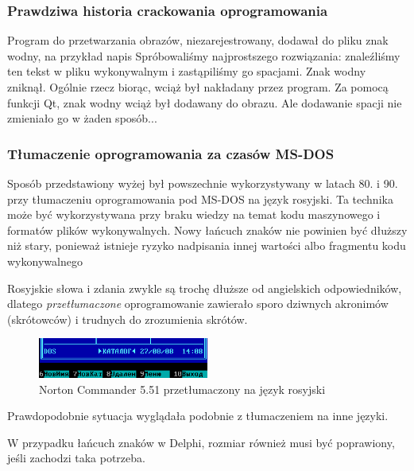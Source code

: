 \subsubsection{Prawdziwa historia crackowania oprogramowania}
\myindex{\SoftwareCracking}

Program do przetwarzania obrazów, niezarejestrowany, dodawał do pliku znak wodny,
na przykład napis 
Spróbowaliśmy najprostszego rozwiązania: znaleźliśmy ten tekst w pliku wykonywalnym i zastąpiliśmy go spacjami.
Znak wodny zniknął.
Ogólnie rzecz biorąc, wciąż był nakładany przez program.
Za pomocą funkcji Qt, znak wodny wciąż był dodawany do obrazu.
Ale dodawanie spacji nie zmieniało go w żaden sposób...

\subsubsection{Tłumaczenie oprogramowania za czasów MS-DOS}

Sposób przedstawiony wyżej był powszechnie wykorzystywany w latach 80. i 90. przy tłumaczeniu oprogramowania pod MS-DOS na język rosyjski.
Ta technika może być wykorzystywana przy braku wiedzy na temat kodu maszynowego i formatów plików wykonywalnych.
Nowy łańcuch znaków nie powinien być dłuższy niż stary, ponieważ istnieje ryzyko nadpisania innej wartości albo fragmentu kodu wykonywalnego

Rosyjskie słowa i zdania zwykle są trochę dłuższe od angielskich odpowiedników, dlatego \emph{przetłumaczone} oprogramowanie zawierało
sporo dziwnych akronimów (skrótowców) i trudnych do zrozumienia skrótów.

\begin{figure}[H]
\centering
\includegraphics[width=0.5\textwidth]{patterns/01_helloworld/Norton_Commander_v5_51.png}
\caption{Norton Commander 5.51 przetłumaczony na język rosyjski}
\end{figure}

Prawdopodobnie sytuacja wyglądała podobnie z tłumaczeniem na inne języki.

W przypadku łańcuch znaków w Delphi, rozmiar również musi być poprawiony, jeśli zachodzi taka potrzeba.



